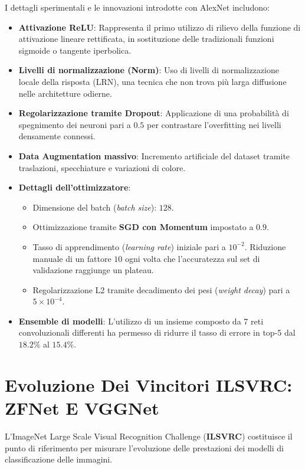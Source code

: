 ﻿\documentclass[11pt, a4paper]{article}
\begin{document}
I dettagli sperimentali e le innovazioni introdotte con AlexNet includono:
\begin{itemize}
    \item \textbf{Attivazione ReLU}: Rappresenta il primo utilizzo di rilievo della funzione di attivazione lineare rettificata, in sostituzione delle tradizionali funzioni sigmoide o tangente iperbolica.
    \item \textbf{Livelli di normalizzazione (Norm)}: Uso di livelli di normalizzazione locale della risposta (LRN), una tecnica che non trova più larga diffusione nelle architetture odierne.
    \item \textbf{Regolarizzazione tramite Dropout}: Applicazione di una probabilità di spegnimento dei neuroni pari a $0.5$ per contrastare l'overfitting nei livelli densamente connessi.
    \item \textbf{Data Augmentation massivo}: Incremento artificiale del dataset tramite traslazioni, specchiature e variazioni di colore.
    \item \textbf{Dettagli dell'ottimizzatore}:
    \begin{itemize}
        \item Dimensione del batch (\emph{batch size}): $128$.
        \item Ottimizzazione tramite \textbf{SGD con Momentum} impostato a $0.9$.
        \item Tasso di apprendimento (\emph{learning rate}) iniziale pari a $10^{-2}$. Riduzione manuale di un fattore $10$ ogni volta che l'accuratezza sul set di validazione raggiunge un plateau.
        \item Regolarizzazione L2 tramite decadimento dei pesi (\emph{weight decay}) pari a $5 \times 10^{-4}$.
    \end{itemize}
    \item \textbf{Ensemble di modelli}: L'utilizzo di un insieme composto da 7 reti convoluzionali differenti ha permesso di ridurre il tasso di errore in top-5 dal $18.2\%$ al $15.4\%$.
\end{itemize}

\newpage

\section{Evoluzione Dei Vincitori ILSVRC: ZFNet E VGGNet}

L'ImageNet Large Scale Visual Recognition Challenge (\textbf{ILSVRC}) costituisce il punto di riferimento per misurare l'evoluzione delle prestazioni dei modelli di classificazione delle immagini.
\end{document}
